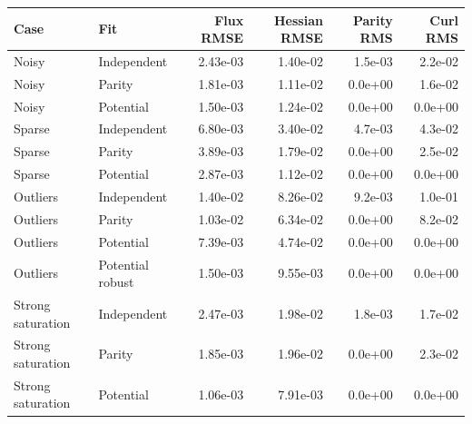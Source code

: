 \begin{tabular}{llrrrr}
\toprule
Case & Fit & Flux RMSE & Hessian RMSE & Parity RMS & Curl RMS\\
\midrule
Noisy & Independent & 2.43e-03 & 1.40e-02 & 1.5e-03 & 2.2e-02 \\
Noisy & Parity & 1.81e-03 & 1.11e-02 & 0.0e+00 & 1.6e-02 \\
Noisy & Potential & 1.50e-03 & 1.24e-02 & 0.0e+00 & 0.0e+00 \\
Sparse & Independent & 6.80e-03 & 3.40e-02 & 4.7e-03 & 4.3e-02 \\
Sparse & Parity & 3.89e-03 & 1.79e-02 & 0.0e+00 & 2.5e-02 \\
Sparse & Potential & 2.87e-03 & 1.12e-02 & 0.0e+00 & 0.0e+00 \\
Outliers & Independent & 1.40e-02 & 8.26e-02 & 9.2e-03 & 1.0e-01 \\
Outliers & Parity & 1.03e-02 & 6.34e-02 & 0.0e+00 & 8.2e-02 \\
Outliers & Potential & 7.39e-03 & 4.74e-02 & 0.0e+00 & 0.0e+00 \\
Outliers & Potential robust & 1.50e-03 & 9.55e-03 & 0.0e+00 & 0.0e+00 \\
Strong saturation & Independent & 2.47e-03 & 1.98e-02 & 1.8e-03 & 1.7e-02 \\
Strong saturation & Parity & 1.85e-03 & 1.96e-02 & 0.0e+00 & 2.3e-02 \\
Strong saturation & Potential & 1.06e-03 & 7.91e-03 & 0.0e+00 & 0.0e+00 \\
\bottomrule
\end{tabular}
